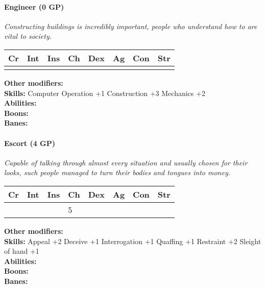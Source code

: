 \documentclass[12pt,a4paper,openany]{book}
\begin{document}
	\paragraph*{Engineer (0 GP)}
	\textit{Constructing buildings is incredibly important, people who understand how to are vital to society.}\par
	\begin{tabular}{|l|l|l|l|l|l|l|l|}
		\hline
		Cr & Int & Ins & Ch & Dex & Ag & Con & Str \\ \hline
		&  &  &  &  &  &  &  \\ \hline
	\end{tabular}\par
	\noindent\textbf{Other modifiers:} \\
	\textbf{Skills:} Computer Operation +1
	Construction +3
	Mechanics +2\\
	\textbf{Abilities:} \\
	\textbf{Boons:} \\
	\textbf{Banes:} \\
	
	\hrulefill
	\paragraph*{Escort (4 GP)}
	\textit{Capable of talking through almost every situation and usually chosen for their looks, such people managed to turn their bodies and tongues into money.}\par
	\begin{tabular}{|l|l|l|l|l|l|l|l|}
		\hline
		Cr & Int & Ins & Ch & Dex & Ag & Con & Str \\ \hline
		&  &  & 5 &  &  &  &  \\ \hline
	\end{tabular}\par
	\noindent\textbf{Other modifiers:} \\
	\textbf{Skills:} Appeal +2
	Deceive +1
	Interrogation +1
	Quaffing +1
	Restraint +2
	Sleight of hand +1\\
	\textbf{Abilities:} \\
	\textbf{Boons:} \\
	\textbf{Banes:} \\
	
	\hrulefill
\end{document}
